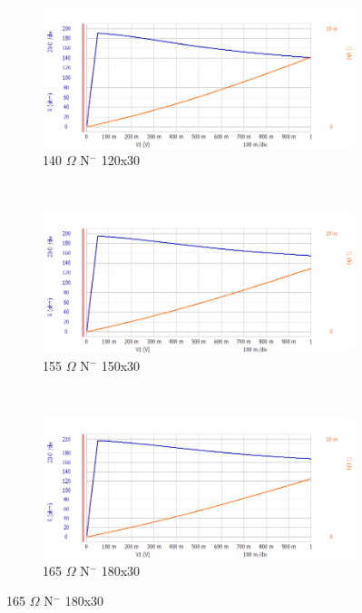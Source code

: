 \documentclass[letter,12pt]{article}
\begin{document}
			\begin{figure}[h!]
				\centering
				\begin{subfigure}[b]{.45\textwidth}
					\includegraphics[width=\textwidth]{./Images/Probe_Test/R_Tub_120x30.png}
					\caption{140 $\Omega$ N$^-$ 120x30}
				\end{subfigure}
				~
				\begin{subfigure}[b]{.45\textwidth}
					\includegraphics[width=\textwidth]{./Images/Probe_Test/R_Tub_150x30.png}
					\caption{155 $\Omega$ N$^-$ 150x30}
				\end{subfigure}
				~
				\begin{subfigure}[b]{.45\textwidth}
					\includegraphics[width=\textwidth]{./Images/Probe_Test/R_Tub_180x30.png}
					\caption{165 $\Omega$ N$^-$ 180x30}
				\end{subfigure}

\end{figure}
\end{document}
